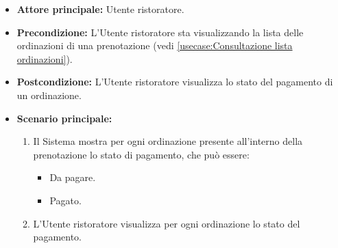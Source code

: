 \label{usecase:Visualizzazione stato di pagamento}
\begin{itemize}
	
    \item \textbf{Attore principale:} Utente ristoratore.

	\item \textbf{Precondizione:} L'Utente ristoratore sta visualizzando la lista delle ordinazioni di una prenotazione (vedi \autoref{usecase:Consultazione lista ordinazioni}).

	\item \textbf{Postcondizione:} L'Utente ristoratore visualizza lo stato del pagamento di un ordinazione.

	\item \textbf{Scenario principale:}
	\begin{enumerate}
		\item Il Sistema mostra per ogni ordinazione presente all'interno della prenotazione lo stato di pagamento, che può essere:
        \begin{itemize}
            \item Da pagare.
            \item Pagato.
        \end{itemize}
        \item L'Utente ristoratore visualizza per ogni ordinazione lo stato del pagamento.
	\end{enumerate}

\end{itemize}
